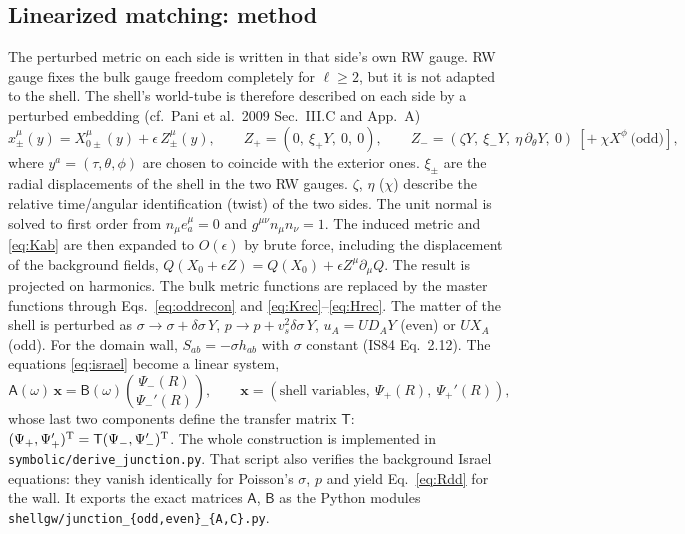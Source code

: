 \documentclass[11pt,a4paper]{article}
\numberwithin{equation}{section}
\begin{document}
\subsection{Linearized matching: method}\label{sec:jmethod}
The perturbed metric on each side is written in that side's own RW gauge. RW gauge fixes the bulk gauge
freedom completely for $\ell\ge2$, but it is not adapted to the shell. The shell's world-tube is therefore
described on each side by a perturbed embedding (cf.\ Pani et al.\ 2009 Sec.~III.C and App.~A)
\begin{equation}
x^\mu_\pm(y)=X^\mu_{0\pm}(y)+\epsilon\,Z^\mu_\pm(y),\qquad
Z_+=(0,\ \xi_+Y,\ 0,\ 0),\qquad Z_-=(\zeta Y,\ \xi_-Y,\ \eta\,\partial_\theta Y,\ 0)\ [+\ \chi X^\phi\ \text{(odd)}],
\label{eq:embed}
\end{equation}
where $y^a=(\tau,\theta,\phi)$ are chosen to coincide with the exterior ones. $\xi_\pm$ are the radial
displacements of the shell in the two RW gauges. $\zeta$, $\eta$ ($\chi$) describe the relative
time/angular identification (twist) of the two sides. The unit normal is solved to first order from
$n_\mu e^\mu_a=0$ and $g^{\mu\nu}n_\mu n_\nu=1$. The induced metric and \eqref{eq:Kab} are then expanded to
$O(\epsilon)$ by brute force, including the displacement of the background fields,
$Q(X_0+\epsilon Z)=Q(X_0)+\epsilon Z^\mu\partial_\mu Q$. The result is projected on harmonics. The bulk
metric functions are replaced by the master functions through Eqs.~\eqref{eq:oddrecon} and
\eqref{eq:Krec}--\eqref{eq:Hrec}. The matter of the shell is perturbed as
$\sigma\to\sigma+\delta\sigma\,Y$, $p\to p+v_s^2\delta\sigma\,Y$, $u_A=U D_AY$ (even) or $U X_A$ (odd). For the
domain wall, $S_{ab}=-\sigma h_{ab}$ with $\sigma$ constant (IS84 Eq.~2.12). The equations \eqref{eq:israel}
become a linear system,
\begin{equation}
\mathsf A(\omega)\,\bm x=\mathsf B(\omega)\binom{\Psi_-(R)}{\Psi_-'(R)},\qquad
\bm x=(\text{shell variables},\ \Psi_+(R),\ \Psi_+'(R)),
\label{eq:linsys}
\end{equation}
whose last two components define the transfer matrix $\mathsf T$:
$(\Psi_+,\Psi_+')^{\rm T}=\mathsf T(\Psi_-,\Psi_-')^{\rm T}$. The whole construction is implemented in
\texttt{symbolic/derive\_junction.py}. That script also verifies the background Israel equations: they
vanish identically for Poisson's $\sigma$, $p$ and yield Eq.~\eqref{eq:Rdd} for the wall. It exports the
exact matrices $\mathsf A$, $\mathsf B$ as the Python modules \texttt{shellgw/junction\_\{odd,even\}\_\{A,C\}.py}.
\end{document}
